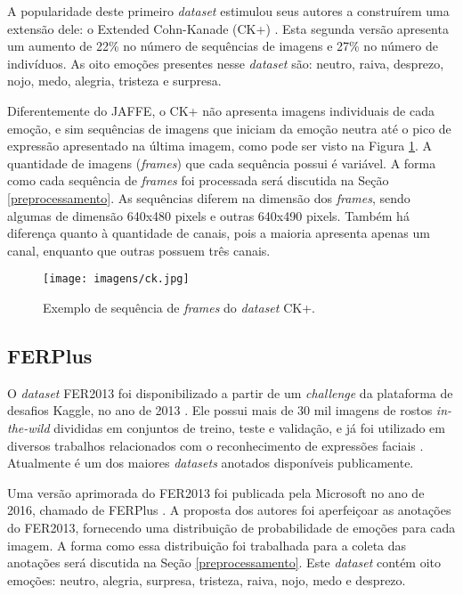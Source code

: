 \documentclass[
12pt,       %
openright,      %
oneside,      %
a4paper,      %
english,      %
french,       %
spanish,      %
brazil        %
]{abntex2}
\begin{document}
A popularidade deste primeiro \textit{dataset} estimulou seus autores a construírem uma extensão dele: o Extended Cohn-Kanade (CK+) \cite{lucey2010extended}. Esta segunda versão apresenta um aumento de 22\% no número de sequências de imagens e 27\% no número de indivíduos. As oito emoções presentes nesse \textit{dataset} são: neutro, raiva, desprezo, nojo, medo, alegria, tristeza e surpresa.

Diferentemente do JAFFE, o CK+ não apresenta imagens individuais de cada emoção, e sim sequências de imagens que iniciam da emoção neutra até o pico de expressão apresentado na última imagem, como pode ser visto na Figura \ref{fig:ck}. A quantidade de imagens (\textit{frames}) que cada sequência possui é variável. A forma como cada sequência de \textit{frames} foi processada será discutida na Seção \ref{preprocessamento}. As sequências diferem na dimensão dos \textit{frames}, sendo algumas de dimensão 640x480 pixels e outras 640x490 pixels. Também há diferença quanto à quantidade de canais, pois a maioria apresenta apenas um canal, enquanto que outras possuem três canais.

\begin{figure}[ht]
\centering
\caption{Exemplo de sequência de \textit{frames} do \textit{dataset} CK+.}
\texttt{[image: imagens/ck.jpg]}
\label{fig:ck}
\end{figure}

\subsection{FERPlus} \label{ferplus}

O \textit{dataset} FER2013 \cite{goodfellow2013challenges} foi disponibilizado a partir de um \textit{challenge} da plataforma de desafios Kaggle, no ano de 2013 \cite{kaggle}. Ele possui mais de 30 mil imagens de rostos \textit{in-the-wild} divididas em conjuntos de treino, teste e validação, e já foi utilizado em diversos trabalhos relacionados com o reconhecimento de expressões faciais \cite{kampel2016, shanli2018}. Atualmente é um dos maiores \textit{datasets} anotados disponíveis publicamente.

Uma versão aprimorada do FER2013 foi publicada pela Microsoft no ano de 2016, chamado de FERPlus \cite{Barsoum2016}. A proposta dos autores foi aperfeiçoar as anotações do FER2013, fornecendo uma distribuição de probabilidade de emoções para cada imagem. A forma como essa distribuição foi trabalhada para a coleta das anotações será discutida na Seção \ref{preprocessamento}. Este \textit{dataset} contém oito emoções: neutro, alegria, surpresa, tristeza, raiva, nojo, medo e desprezo.
\end{document}
